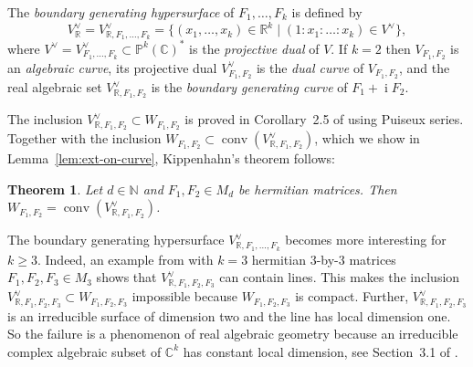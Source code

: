 \documentclass[12pt]{amsart}
\newtheorem{thm}{Theorem}[section]
\theoremstyle{definition}
\numberwithin{equation}{section}
\begin{document}
The {\em boundary generating hypersurface} \cite{ChienNakazato2010} of 
$F_1,\ldots,F_k$ is defined by 
\[
V^\vee_{\mathbb R}
=V^\vee_{{\mathbb R},F_1,\ldots,F_k}
=\{(x_1,\ldots,x_k)\in{\mathbb R}^k \mid (1:x_1:\ldots:x_k)\in V^\vee \},
\]
where $V^\vee=V^\vee_{F_1,\ldots,F_k}\subset{\mathbb P}^k({\mathbb C})^*$ is the 
{\em projective dual} \cite{Gelfand-etal1994} of $V$. If $k=2$ then 
$V_{F_1,F_2}$ is an {\em algebraic curve}, its projective dual 
$V^\vee_{F_1,F_2}$ is the {\em dual curve} \cite{Fischer2001} of 
$V_{F_1,F_2}$, and the real algebraic set $V^\vee_{{\mathbb R},F_1,F_2}$ is 
the {\em boundary generating curve} \cite{Kippenhahn1951} of 
$F_1+{\operatorname{i}} F_2$.  
\par
The inclusion $V^\vee_{{\mathbb R},F_1,F_2}\subset W_{F_1,F_2}$ is proved in
Corollary~2.5 of \cite{ChienNakazato2010} using Puiseux series. Together 
with the inclusion $W_{F_1,F_2}\subset{\operatorname{conv}}(V^\vee_{{\mathbb R},F_1,F_2})$, 
which we show in Lemma~\ref{lem:ext-on-curve}, Kippenhahn's theorem
\cite{Kippenhahn1951} follows:
\begin{thm}\label{thm:kippenhahn}
Let $d\in{\mathbb N}$ and $F_1,F_2\in M_d$ be hermitian matrices.
Then $W_{F_1,F_2}={\operatorname{conv}}(V^\vee_{{\mathbb R},F_1,F_2})$.
\end{thm}
\par
The boundary generating hypersurface $V^\vee_{{\mathbb R},F_1,\ldots,F_k}$ becomes 
more interesting for $k\geq 3$. Indeed, an example from \cite{ChienNakazato2010} 
with $k=3$ hermitian $3$-by-$3$ matrices $F_1,F_2,F_3\in M_3$ shows that 
$V^\vee_{{\mathbb R},F_1,F_2,F_3}$ can contain lines. This makes the inclusion 
$V^\vee_{{\mathbb R},F_1,F_2,F_3} \subset W_{F_1,F_2,F_3}$ impossible because 
$W_{F_1,F_2,F_3}$ is compact. Further, $V^\vee_{{\mathbb R},F_1,F_2,F_3}$ is an 
irreducible surface of dimension two and the line has local dimension one. So 
the failure is a phenomenon of real algebraic geometry because an irreducible 
complex algebraic subset of ${\mathbb C}^k$ has constant local dimension, see 
Section~3.1 of \cite{Bochnak-etal1998}. 
\end{document}
